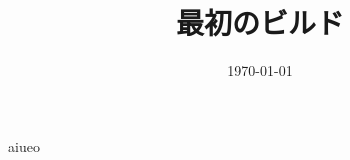 \documentclass[a4paper,11pt]{article}
\begin{document}
\title{最初のビルド}
\author{}
\date{\today}
\maketitle

aiueo
\end{document}

